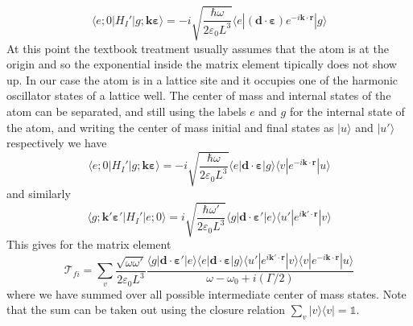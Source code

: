 \documentclass[11pt,letter]{article}
\newcommand{\bv}[1]{\ensuremath{\bm{#1}}}
\begin{document}
\begin{equation}
   \langle e; 0 | H_{I}' | g; \bv{k}\bv{\varepsilon} \rangle = 
       -i \sqrt{ \frac{ \hbar \omega }{2 \varepsilon_{0} L^{3} }} 
      \langle e | (\bv{d} \cdot \bv{\varepsilon} ) e^{-i\bv{k}\cdot\bv{r}}| g \rangle
\end{equation}
At this point the textbook treatment usually assumes that the atom is at the
origin and so the exponential inside the matrix element tipically does not show
up.  In our case the atom is in a lattice site and it occupies one of the
harmonic oscillator states of a lattice well.   The center of mass and internal
states of the atom can be separated,   and still using the labels $e$ and $g$
for the internal state of the atom, and writing the center of mass initial and final states as $| u \rangle$ and $|u'\rangle$ respectively we have
\begin{equation}
   \langle e; 0 | H_{I}' | g; \bv{k}\bv{\varepsilon} \rangle = 
       -i \sqrt{ \frac{ \hbar \omega }{2 \varepsilon_{0} L^{3} }} 
      \langle e | \bv{d} \cdot \bv{\varepsilon} | g \rangle 
      \langle v | e^{-i\bv{k}\cdot\bv{r}} | u \rangle
\end{equation}
and similarly
\begin{equation}
   \langle g; \bv{k}'\bv{\varepsilon}' | H_{I}' | e; 0\rangle = 
       i \sqrt{ \frac{ \hbar \omega' }{2 \varepsilon_{0} L^{3} }} 
      \langle g | \bv{d} \cdot \bv{\varepsilon}' | e \rangle 
      \langle u' | e^{i\bv{k}'\cdot\bv{r}} | v \rangle
\end{equation}
This gives for the matrix element
\begin{equation}
    \mathcal{T}_{fi} = \sum_{v} \frac{\sqrt{\omega \omega'}}{2\varepsilon_{0} L^{3}}
    \frac{ 
      \langle g | \bv{d} \cdot \bv{\varepsilon}' | e \rangle 
      \langle e | \bv{d} \cdot \bv{\varepsilon} | g \rangle 
      \langle u'| e^{i\bv{k}'\cdot\bv{r}} | v \rangle 
      \langle v | e^{-i\bv{k}\cdot\bv{r}} | u  \rangle
       }
        { \omega - \omega_{0} + i (\Gamma/2 ) }
\end{equation}
where we have summed over all possible intermediate center of mass states.  Note that the sum can be taken out using the closure relation $\sum_{v}|v\rangle\langle v| = \mathbb{1}$. 
\end{document}
